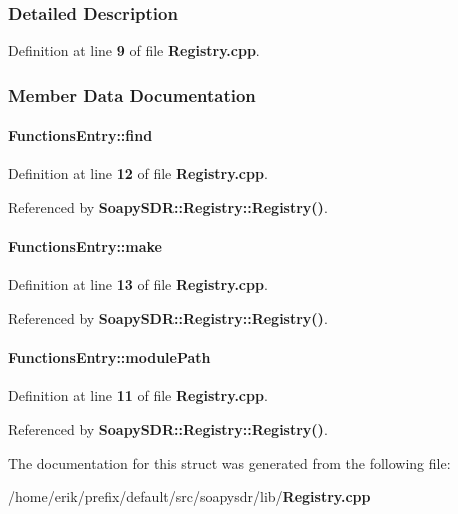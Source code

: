 \subsubsection{Detailed Description}


Definition at line {\bf 9} of file {\bf Registry.\+cpp}.



\subsubsection{Member Data Documentation}
\paragraph[{find}]{ Functions\+Entry\+::find}\label{structFunctionsEntry_a30882b1bf6a04ce21a04b6dc76439a80}


Definition at line {\bf 12} of file {\bf Registry.\+cpp}.



Referenced by {\bf Soapy\+S\+D\+R\+::\+Registry\+::\+Registry()}.

\paragraph[{make}]{ Functions\+Entry\+::make}\label{structFunctionsEntry_a781884b6e27a37bd8409de81b44a0d89}


Definition at line {\bf 13} of file {\bf Registry.\+cpp}.



Referenced by {\bf Soapy\+S\+D\+R\+::\+Registry\+::\+Registry()}.

\paragraph[{module\+Path}]{ Functions\+Entry\+::module\+Path}\label{structFunctionsEntry_a71eb5fe6049ccd2b71b871dcb4eaae1e}


Definition at line {\bf 11} of file {\bf Registry.\+cpp}.



Referenced by {\bf Soapy\+S\+D\+R\+::\+Registry\+::\+Registry()}.



The documentation for this struct was generated from the following file\+:\begin{DoxyCompactItemize}
\item 
/home/erik/prefix/default/src/soapysdr/lib/{\bf Registry.\+cpp}\end{DoxyCompactItemize}
